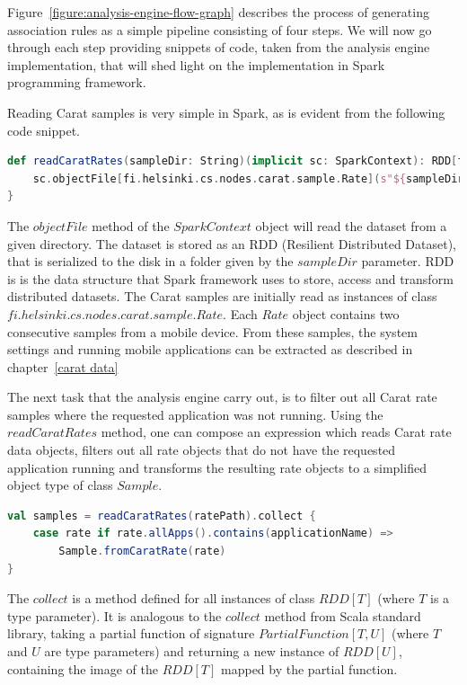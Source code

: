 Figure~\ref{figure:analysis-engine-flow-graph} describes the process of generating association rules as a simple pipeline consisting of four steps. We will now go through each step providing snippets of code, taken from the analysis engine implementation, that will shed light on the implementation in Spark programming framework. 

Reading Carat samples is very simple in Spark, as is evident from the following code snippet.  

\begin{minipage}{\linewidth}
\begin{lstlisting}[language=scala]
def readCaratRates(sampleDir: String)(implicit sc: SparkContext): RDD[fi.helsinki.cs.nodes.carat.sample.Rate] = {
	sc.objectFile[fi.helsinki.cs.nodes.carat.sample.Rate](s"${sampleDir}")
}
\end{lstlisting}
\end{minipage}

The $objectFile$ method of the $SparkContext$ object will read the dataset from a given directory. The dataset is stored as an RDD (Resilient Distributed Dataset), that is serialized to the disk in a folder given by the $sampleDir$ parameter. RDD is is the data structure that Spark framework uses to store, access and transform distributed datasets. The Carat samples are initially read as instances of class $fi.helsinki.cs.nodes.carat.sample.Rate$. Each $Rate$ object contains two consecutive samples from a mobile device. From these samples, the system settings and running mobile applications can be extracted as described in chapter~\ref{carat data}  

The next task that the analysis engine carry out, is to filter out all Carat rate samples where the requested application was not running. Using the $readCaratRates$ method, one can compose an expression which reads Carat rate data objects, filters out all rate objects that do not have the requested application running and transforms the resulting rate objects to a simplified object type of class $Sample$. 

\begin{minipage}{\linewidth}
\begin{lstlisting}[language=scala]
val samples = readCaratRates(ratePath).collect {
	case rate if rate.allApps().contains(applicationName) => 
		Sample.fromCaratRate(rate)
}
\end{lstlisting}
\end{minipage}  
The $collect$ is a method defined for all instances of class $RDD[T]$ (where $T$ is a type parameter). It is analogous to the $collect$ method from Scala standard library, taking a partial function of signature $PartialFunction[T, U]$  (where $T$ and $U$ are type parameters) and returning a new instance of $RDD[U]$, containing the image of the $RDD[T]$ mapped by the partial function.
        

